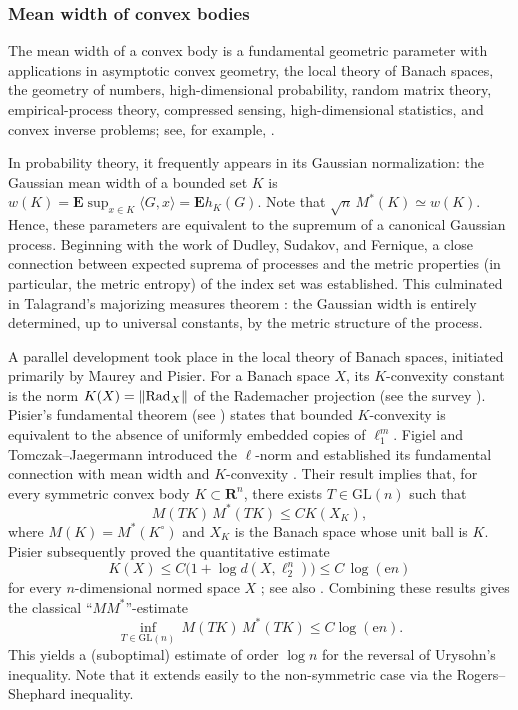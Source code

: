 \documentclass[11pt]{amsart}
\newcommand{\R}{\mathbf R}
\newcommand{\E}{\mathbf E}
\newcommand{\GL}{\mathrm{GL}}
\newcommand{\1}{\mathbf 1}
\newcommand{\e}{\mathrm{e}}
\theoremstyle{plain}
\begin{document}
 \subsubsection{Mean width of convex bodies}
 \label{sec:mean-width}

 The mean width of a convex body is a fundamental geometric parameter with applications in asymptotic convex geometry, the local theory of Banach spaces, the geometry of numbers, high-dimensional probability, random matrix theory, empirical-process theory, compressed sensing, high-dimensional statistics, and convex inverse problems; see, for example, \cite{AubSza17, Ver18, Reg22}.
 
 In probability theory, it frequently appears in its Gaussian normalization: the Gaussian mean width of a bounded set $K$ is $w(K) =\E\sup_{x\in K}\langle G,x\rangle
= \E h_K(G)$. Note that $\sqrt{n} \, M^\ast(K) \simeq w(K)$.
Hence, these parameters are equivalent to the supremum of a canonical Gaussian process. Beginning with the work of Dudley, Sudakov, and Fernique, a close connection between expected suprema of processes and the metric properties (in particular, the metric entropy) of the index set was established. This culminated in Talagrand's majorizing measures theorem \cite{Tal87,Tal05}: the Gaussian width is entirely determined, up to universal constants, by the metric structure of the process.

A parallel development took place in the local theory of Banach spaces, initiated primarily by Maurey and Pisier. For a Banach space $X$, its $K$-convexity constant is the norm $K(X)=\|{\rm {Rad}}_{X}\|$ of the Rademacher projection (see the survey \cite{Mau03}). Pisier's fundamental theorem (see \cite{Pis82}) states that bounded $K$-convexity is equivalent to the absence of uniformly embedded copies of $\ell _1^m$. Figiel and Tomczak--Jaegermann introduced the $\ell$-norm and established its fundamental connection with mean width and $K$-convexity \cite{FigTomJae79}. Their result implies that, for every symmetric convex body $K\subset\R^n$, there exists $T\in \GL(n)$ such that
\begin{equation}
\label{FT}
M(TK) \, M^\ast(TK)\leq CK(X_K),
\end{equation}
where $M(K)=M^\ast(K^{\circ})$ and $X_{K}$ is the Banach space whose unit ball is $K$. Pisier subsequently proved the quantitative estimate
\[
K(X)\leq C\bigl(1+\log d(X,\ell_2^n)\bigr)\leq C\, \log(\e n)
\]
for every $n$-dimensional normed space $X$ \cite{Pis81}; see also \cite[Chapter~2]{Pis89}. Combining these results gives the classical ``$MM^\ast$''-estimate
\[
\inf_{T\in \GL(n)}\, M(TK)\, M^\ast(TK)\leq C\log(\e n).
\]
This yields a (suboptimal) estimate of order $\log n$ for the reversal of Urysohn's inequality.
Note that it extends easily to the non-symmetric case via the Rogers--Shephard inequality.
\end{document}
